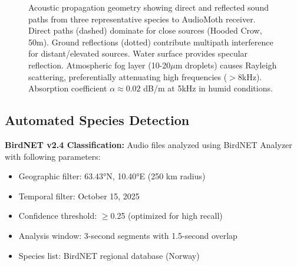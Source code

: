 \documentclass[twocolumn]{article}
\begin{document}
\begin{figure}[t]
\caption{Acoustic propagation geometry showing direct and reflected sound paths from three representative species to AudioMoth receiver. Direct paths (dashed) dominate for close sources (Hooded Crow, 50m). Ground reflections (dotted) contribute multipath interference for distant/elevated sources. Water surface provides specular reflection. Atmospheric fog layer (10-20$\mu$m droplets) causes Rayleigh scattering, preferentially attenuating high frequencies ($>$8kHz). Absorption coefficient $\alpha \approx 0.02$ dB/m at 5kHz in humid conditions.}
\label{fig:acoustic_propagation}
\end{figure}

\subsection{Automated Species Detection}

\textbf{BirdNET v2.4 Classification:} Audio files analyzed using BirdNET Analyzer \citep{Kahl2021} with following parameters:

\begin{itemize}
\item Geographic filter: 63.43°N, 10.40°E (250 km radius)
\item Temporal filter: October 15, 2025
\item Confidence threshold: $\geq$0.25 (optimized for high recall)
\item Analysis window: 3-second segments with 1.5-second overlap
\item Species list: BirdNET regional database (Norway)
\end{itemize}
\end{document}
